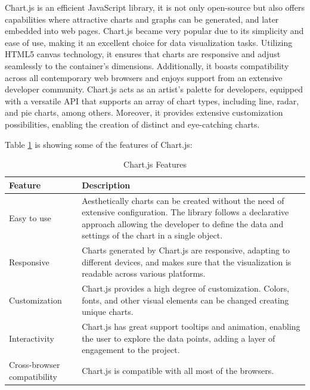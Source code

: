 Chart.js is an efficient JavaScript library, it is not only open-source but also offers capabilities where attractive charts and graphs can be generated, and later
embedded into web pages. Chart.js became very popular due to its simplicity and ease of use, making it an excellent choice for data visualization tasks. Utilizing HTML5 
canvas technology, it ensures that charts are responsive and adjust seamlessly to the container's dimensions. Additionally, it boasts compatibility across 
all contemporary web browsers and enjoys support from an extensive developer community. Chart.js acts as an artist's palette for developers, equipped with 
a versatile API that supports an array of chart types, including line, radar, and pie charts, among others. Moreover, it provides extensive customization 
possibilities, enabling the creation of distinct and eye-catching charts.\cite{da2019learn}

Table \ref{tab:chart-js-features} is showing some of the features of Chart.js\cite{da2019learn}:

\begin{table}[H]
    \centering

    \begin{tabularx}{\textwidth}{|l|X|}
        \hline
        \textbf{Feature}            & \textbf{Description}                                                                                                                                                                                                \\
        \hline
        Easy to use                 & Aesthetically charts can be created without the need of extensive configuration. The library follows a declarative approach allowing the developer to define the data and settings of the chart in a single object. \\
        \hline
        Responsive                  & Charts generated by Chart.js are responsive, adapting to different devices, and makes sure that the visualization is readable across various platforms.                              \\
        \hline
        Customization               & Chart.js provides a high degree of customization. Colors, fonts, and other visual elements can be changed creating unique charts.                                                      \\
        \hline
        Interactivity               & Chart.js has great support tooltips and animation, enabling the user to explore the data points, adding a layer of engagement to the project.                                                               \\
        \hline
        Cross-browser compatibility & Chart.js is compatible with all most of the browsers.                                                                                                 \\
        \hline
    \end{tabularx}
    \label{tab:chart-js-features}
    \caption{Chart.js Features}
\end{table}

